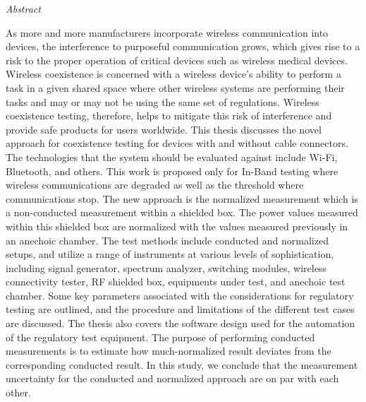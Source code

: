 

\newpage
\thispagestyle{empty}
\begin{center}
\Huge\emph{Abstract}
\end{center}
\medskip
\noindent As more and more manufacturers incorporate wireless communication into devices, the interference to purposeful communication grows, which gives rise to a risk to the proper operation of critical devices such as wireless medical devices. Wireless coexistence is concerned with a wireless device's ability to perform a task in a given shared space where other wireless systems are performing their tasks and may or may not be using the same set of regulations. Wireless coexistence testing, therefore, helps to mitigate this risk of interference and provide safe products for users worldwide. This thesis discusses the novel approach for coexistence testing for devices with and without cable connectors. The technologies that the system should be evaluated against include Wi-Fi\texttrademark{}, Bluetooth\textregistered{}, and others. This work is proposed only for In-Band testing where wireless communications are degraded as well as the threshold where communications stop. The new approach is the normalized measurement which is a non-conducted measurement within a shielded box. The power values measured within this shielded box are normalized with the values measured previously in an anechoic chamber.
The test methods include conducted and normalized setups, and utilize a range of instruments at various levels of sophistication, including signal generator, spectrum analyzer, switching modules, wireless connectivity tester, RF shielded box, equipments under test, and anechoic test chamber. Some key parameters associated with the considerations for regulatory testing are outlined, and the procedure and limitations of the different test cases are discussed. The thesis also covers the software design used for the automation of the regulatory test equipment. The purpose of performing conducted measurements is to estimate how much-normalized result deviates from the corresponding conducted result. In this study, we conclude that the measurement uncertainty for the conducted and normalized approach are on par with each other. 




















